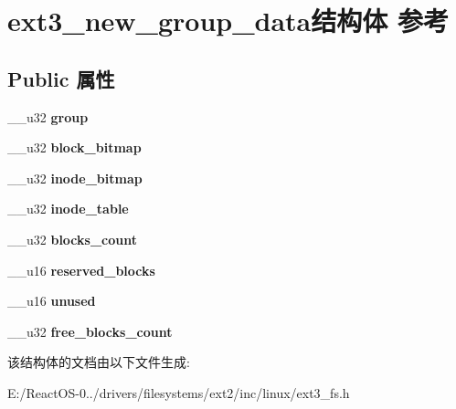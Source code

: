 \hypertarget{structext3__new__group__data}{}\section{ext3\+\_\+new\+\_\+group\+\_\+data结构体 参考}
\label{structext3__new__group__data}
\subsection*{Public 属性}
\begin{DoxyCompactItemize}
\item 
\mbox{\label{structext3__new__group__data_a5264dcbef0a6882eed0005668fad7d06}} 
\+\_\+\+\_\+u32 {\bfseries group}
\item 
\mbox{\label{structext3__new__group__data_a67a67fc36a3cad4551858d4cf64099a1}} 
\+\_\+\+\_\+u32 {\bfseries block\+\_\+bitmap}
\item 
\mbox{\label{structext3__new__group__data_ab7617c1139661821e498f5013ac7abea}} 
\+\_\+\+\_\+u32 {\bfseries inode\+\_\+bitmap}
\item 
\mbox{\label{structext3__new__group__data_af42de0687b2f400a1a99074a3eff199f}} 
\+\_\+\+\_\+u32 {\bfseries inode\+\_\+table}
\item 
\mbox{\label{structext3__new__group__data_a57222c2abd04f9fceed39f7c92bbeb5e}} 
\+\_\+\+\_\+u32 {\bfseries blocks\+\_\+count}
\item 
\mbox{\label{structext3__new__group__data_ae1f6af7cf2dbbebb1c09bb96dd97c883}} 
\+\_\+\+\_\+u16 {\bfseries reserved\+\_\+blocks}
\item 
\mbox{\label{structext3__new__group__data_a8fc10a58ecc1f01f03bc8dea10c1d2a5}} 
\+\_\+\+\_\+u16 {\bfseries unused}
\item 
\mbox{\label{structext3__new__group__data_a7d433427ed8c3bdb38c87919a151a4b0}} 
\+\_\+\+\_\+u32 {\bfseries free\+\_\+blocks\+\_\+count}
\end{DoxyCompactItemize}


该结构体的文档由以下文件生成\+:\begin{DoxyCompactItemize}
\item 
E\+:/\+React\+O\+S-\/0../drivers/filesystems/ext2/inc/linux/ext3\+\_\+fs.\+h\end{DoxyCompactItemize}
